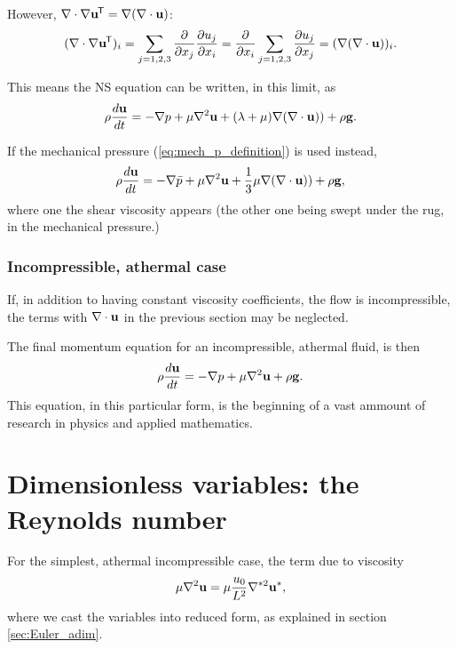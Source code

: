 However, $\nabla \cdot  \nabla\mathbf{u}^{\mkern-1.5mu\mathsf{T}} = \nabla  (\nabla\cdot\mathbf{u})$:
\[
(\nabla \cdot \nabla\mathbf{u}^{\mkern-1.5mu\mathsf{T}} )_i =
\sum_{j=1,2,3} 
\frac{\partial}{\partial x_j} 
\frac{\partial u_j}{\partial x_i}
=
\frac{\partial}{\partial x_i} 
\sum_{j=1,2,3} 
\frac{\partial u_j }{\partial x_j} 
= (\nabla  (\nabla\cdot\mathbf{u}))_i .
\]

This means the NS equation can be written, in this limit,
as
\begin{equation}
  \label{eq:NS_const_viscs}
  \rho \frac{d\mathbf{u} }{dt} =
  - \nabla p +
   \mu \nabla^2  \mathbf{u}
  + ( \lambda  + \mu) \nabla ( \nabla\cdot\mathbf{u} ) )
  + \rho \mathbf{g} .
\end{equation}



If the mechanical pressure (\ref{eq:mech_p_definition}) is used instead,
\begin{equation}
  \label{eq:NS_const_viscs_mech_press}
  \rho \frac{d\mathbf{u} }{dt} =
  - \nabla \bar{p} +
  \mu \nabla^2  \mathbf{u}
  + \frac13  \mu \nabla ( \nabla\cdot\mathbf{u} ) )
  + \rho \mathbf{g} ,
\end{equation}
where one the shear viscosity appears (the other one being swept under
the rug, in the mechanical pressure.)


\subsubsection{Incompressible, athermal case}

If, in addition to having constant viscosity coefficients, the flow is
incompressible, the terms with $\nabla\cdot\mathbf{u}$ in the previous section may be
neglected.

The final momentum equation for an incompressible, athermal fluid, is
then
\begin{equation}
  \label{eq:NS_usual}
  \rho \frac{d\mathbf{u} }{dt} =
  - \nabla p 
  + \mu \nabla^2 \mathbf{u}
  + \rho \mathbf{g} .
\end{equation}
This equation, in this particular form, is the beginning of a vast
ammount of research in physics and applied mathematics.





\section{Dimensionless variables: the Reynolds number}

For the simplest, athermal incompressible case, the term due to
viscosity
\[
\mu \nabla^2 \mathbf{u} = \mu \frac{u_0}{L^2} \nabla^{*2} \mathbf{u}^* ,
\]
where we cast the variables into reduced form, as explained in
section \ref{sec:Euler_adim}.

